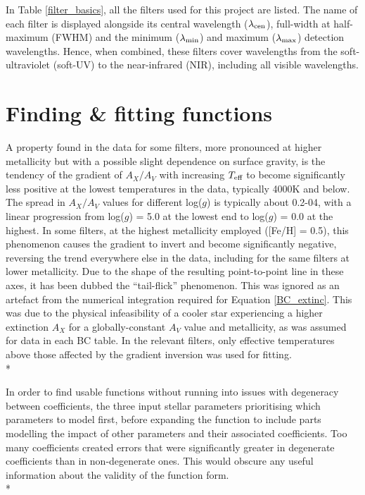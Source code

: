 \documentclass[12pt, a4paper]{report}
\begin{document}
In Table \ref{filter_basics}, all the filters used for this project are listed. The name of each filter is displayed alongside its central wavelength ($\lambda_{\textnormal{cen}}$), full-width at half-maximum (FWHM) and the minimum ($\lambda_{\textnormal{min}}$) and maximum ($\lambda_{\textnormal{max}}$) detection wavelengths. Hence, when combined, these filters cover wavelengths from the soft-ultraviolet (soft-UV) to the near-infrared (NIR),  including all visible wavelengths.


\section{Finding \& fitting functions} \label{find_fit}
A property found in the data for some filters, more pronounced at higher metallicity but with a possible slight dependence on surface gravity, is the tendency of the gradient of $A_{X}/A_{V}$ with increasing $T_{\textnormal{eff}}$ to become significantly less positive at the lowest temperatures in the data, typically 4000K and below. The spread in $A_{X}/A_{V}$ values for different log($g$) is typically about 0.2-04, with a linear progression from log($g$) = 5.0 at the lowest end to log($g$) = 0.0 at the highest. In some filters, at the highest metallicity employed ([Fe/H] = 0.5), this phenomenon causes the gradient to invert and become significantly negative, reversing the trend everywhere else in the data, including for the same filters at lower metallicity. Due to the shape of the resulting point-to-point line in these axes, it has been dubbed the ``tail-flick'' phenomenon. This was ignored as an artefact from the numerical integration required for Equation \ref{BC_extinc}. This was due to the physical infeasibility of a cooler star experiencing a higher extinction $A_{X}$ for a globally-constant $A_{V}$ value and metallicity, as was assumed for data in each BC table. In the relevant filters, only effective temperatures above those affected by the gradient inversion was used for fitting.\\*

In order to find usable functions without running into issues with degeneracy between coefficients, the three input stellar parameters prioritising which parameters to model first, before expanding the function to include parts modelling the impact of other parameters and their associated coefficients. Too many coefficients created errors that were significantly greater in degenerate coefficients than in non-degenerate ones. This would obscure any useful information about the validity of the function form.\\*
\end{document}
